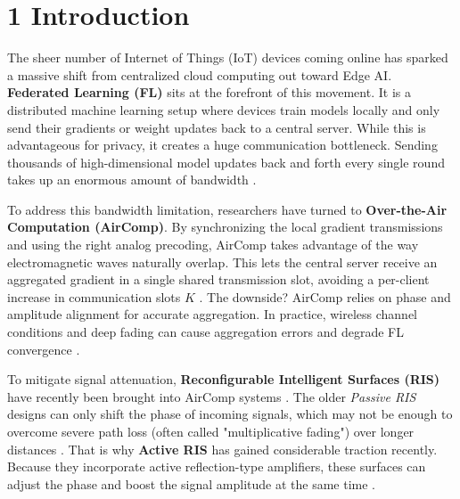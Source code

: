 \documentclass[10pt,twocolumn]{article}
\begin{document}
\section{1	Introduction}

The sheer number of Internet of Things (IoT) devices coming online has sparked a massive shift from centralized cloud computing out toward Edge AI. \textbf{Federated Learning (FL)} sits at the forefront of this movement. It is a distributed machine learning setup where devices train models locally and only send their gradients or weight updates back to a central server. While this is advantageous for privacy, it creates a huge communication bottleneck. Sending thousands of high-dimensional model updates back and forth every single round takes up an enormous amount of bandwidth  \parencite[]{shiqiang_wang_04286fb1, wei_yang_bryan_lim_de754dfb}.

To address this bandwidth limitation, researchers have turned to \textbf{Over-the-Air Computation (AirComp)}. By synchronizing the local gradient transmissions and using the right analog precoding, AirComp takes advantage of the way electromagnetic waves naturally overlap. This lets the central server receive an aggregated gradient in a single shared transmission slot, avoiding a per-client increase in communication slots $K$  \parencite{xiaowen_cao_3da29c98}. The downside? AirComp relies on phase and amplitude alignment for accurate aggregation. In practice, wireless channel conditions and deep fading can cause aggregation errors and degrade FL convergence  \parencite[]{jingyang_zhu_dc837054, xiaowen_cao_363accb9}.

To mitigate signal attenuation, \textbf{Reconfigurable Intelligent Surfaces (RIS)} have recently been brought into AirComp systems  \parencite{wanli_ni_d7a6fb6d}. The older \textit{Passive RIS} designs can only shift the phase of incoming signals, which may not be enough to overcome severe path loss (often called "multiplicative fading") over longer distances  \parencite[]{kai_yang_e91a43a3, zijian_zhang_9030ef0d}. That is why \textbf{Active RIS} has gained considerable traction recently. Because they incorporate active reflection-type amplifiers, these surfaces can adjust the phase and boost the signal amplitude at the same time  \parencite[]{ruizhe_long_83e9453a, zijian_zhang_9030ef0d}.
\end{document}
